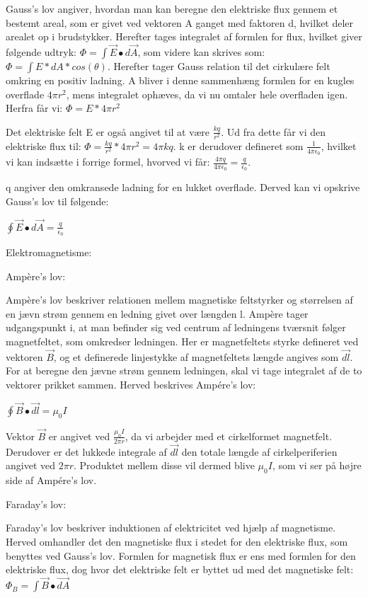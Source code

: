 Gauss's lov angiver, hvordan man kan beregne den elektriske flux gennem et bestemt areal, som er givet ved vektoren A ganget med faktoren d, hvilket deler arealet op i brudstykker. Herefter tages integralet af formlen for flux, hvilket giver følgende udtryk: $\Phi = \int \vec{E} \bullet d \vec{A}$, som videre kan skrives som: $\Phi = \int E * dA * cos(\theta)$. Herefter tager Gauss relation til det cirkulære felt omkring en positiv ladning. A bliver i denne sammenhæng formlen for en kugles overflade $4 \pi r^2$, mens integralet ophæves, da vi nu omtaler hele overfladen igen. Herfra får vi: $\Phi = E * 4 \pi r^2$

Det elektriske felt E er også angivet til at være $\frac{kq}{r^2}$. Ud fra dette får vi den elektriske flux til: $\Phi = \frac{kq}{r^2} * 4 \pi r^2 = 4 \pi k q$. k er derudover defineret som $\frac{1}{4 \pi \epsilon_0}$, hvilket vi kan indsætte i forrige formel, hvorved vi får: $\frac{4 \pi q}{4 \pi \epsilon_0} = \frac{q}{\epsilon_0}$.

q angiver den omkransede ladning for en lukket overflade. Derved kan vi opskrive Gauss's lov til følgende:

\centerline{$\oint \vec{E} \bullet d \vec{A} = \frac{q}{\epsilon_0}$}

Elektromagnetisme:

Ampère's lov:

Ampère's lov beskriver relationen mellem magnetiske feltstyrker og størrelsen af en jævn strøm gennem en ledning givet over længden l. Ampère tager udgangspunkt i, at man befinder sig ved centrum af ledningens tværsnit følger magnetfeltet, som omkredser ledningen. Her er magnetfeltets styrke defineret ved vektoren $\vec{B}$, og et definerede linjestykke af magnetfeltets længde angives som $\vec{dl}$. For at beregne den jævne strøm gennem ledningen, skal vi tage integralet af de to vektorer prikket sammen. Herved beskrives Ampére's lov:

\centerline{$\oint \vec{B} \bullet \vec{dl} = \mu_0 I$}

Vektor $\vec{B}$ er angivet ved $\frac{\mu_0 I}{2 \pi r}$, da vi arbejder med et cirkelformet magnetfelt. Derudover er det lukkede integrale af $\vec{dl}$ den totale længde af cirkelperiferien angivet ved $2 \pi r$. Produktet mellem disse vil dermed blive $\mu_0 I$, som vi ser på højre side af Ampére's lov.

Faraday's lov:

Faraday's lov beskriver induktionen af elektricitet ved hjælp af magnetisme. Herved omhandler det den magnetiske flux i stedet for den elektriske flux, som benyttes ved Gauss's lov. Formlen for magnetisk flux er ens med formlen for den elektriske flux, dog hvor det elektriske felt er byttet ud med det magnetiske felt: $\Phi_B = \int \vec{B} \bullet \vec{dA}$

